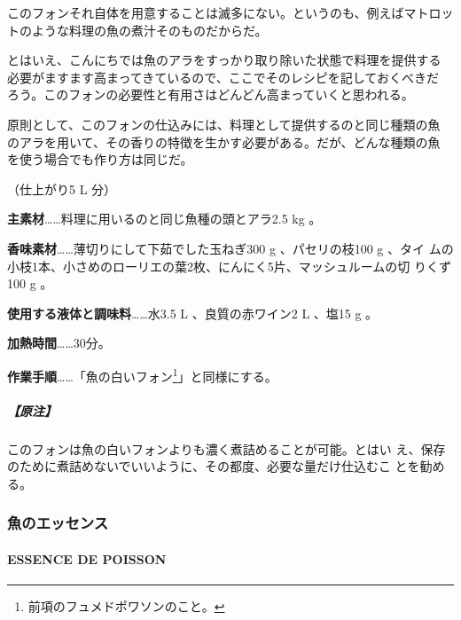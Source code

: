 \documentclass[twoside,12Q,b5j]{escoffierltjsbook}
\newenvironment{recette}{\begin{multicols}{2}}{\end{multicols}}
\begin{document}
\begin{recette}

このフォンそれ自体を用意することは滅多にない。というのも、例えばマトロッ
トのような料理の魚の煮汁そのものだからだ。

とはいえ、こんにちでは魚のアラをすっかり取り除いた状態で料理を提供する
必要がますます高まってきているので、ここでそのレシピを記しておくべきだ
ろう。このフォンの必要性と有用さはどんどん高まっていくと思われる。

原則として、このフォンの仕込みには、料理として提供するのと同じ種類の魚
のアラを用いて、その香りの特徴を生かす必要がある。だが、どんな種類の魚
を使う場合でも作り方は同じだ。

（仕上がり5 L 分）

\textbf{主素材}\ldots{}\ldots{}料理に用いるのと同じ魚種の頭とアラ2.5 kg
。

\textbf{香味素材}\ldots{}\ldots{}薄切りにして下茹でした玉ねぎ300 g
、パセリの枝100 g 、タイ
ムの小枝1本、小さめのローリエの葉2枚、にんにく5片、マッシュルームの切
りくず100 g 。

\textbf{使用する液体と調味料}\ldots{}\ldots{}水3.5 L 、良質の赤ワイン2 L
、塩15 g 。

\textbf{加熱時間}\ldots{}\ldots{}30分。

\textbf{作業手順}\ldots{}\ldots{}「魚の白いフォン\footnote{前項のフュメドポワソンのこと。}」と同様にする。

\subparagraph{【原注】}\label{ux539fux6ce8-3}

このフォンは魚の白いフォンよりも濃く煮詰めることが可能。とはい
え、保存のために煮詰めないでいいように、その都度、必要な量だけ仕込むこ
とを勧める。

\vspace*{2\zw}

\subsubsection{魚のエッセンス}\label{ux9b5aux306eux30a8ux30c3ux30bbux30f3ux30b9}

\paragraph{ESSENCE DE POISSON}\label{essence-de-poisson}



\end{recette}
\end{document}
